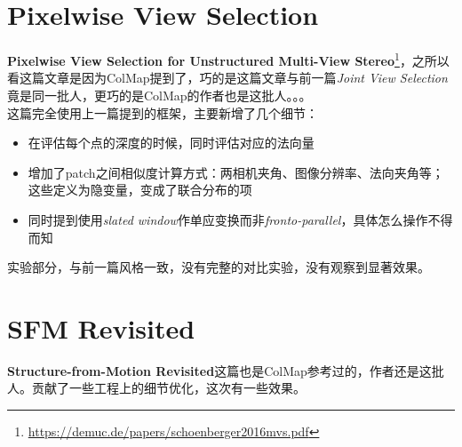 \section{Pixelwise View Selection}

\textbf{Pixelwise View Selection for Unstructured Multi-View Stereo}\footnote{\url{https://demuc.de/papers/schoenberger2016mvs.pdf}}，之所以看这篇文章是因为ColMap提到了，巧的是这篇文章与前一篇\textit{Joint View Selection}竟是同一批人，更巧的是ColMap的作者也是这批人。。。\\

这篇完全使用上一篇提到的框架，主要新增了几个细节：
\begin{itemize}
	\item 在评估每个点的深度的时候，同时评估对应的法向量
	\item 增加了patch之间相似度计算方式：两相机夹角、图像分辨率、法向夹角等；这些定义为隐变量，变成了联合分布的项
	\item 同时提到使用\textit{slated window}作单应变换而非\textit{fronto-parallel}，具体怎么操作不得而知
\end{itemize}

实验部分，与前一篇风格一致，没有完整的对比实验，没有观察到显著效果。\\

\section{SFM Revisited}

\textbf{Structure-from-Motion Revisited}这篇也是ColMap参考过的，作者还是这批人。贡献了一些工程上的细节优化，这次有一些效果。